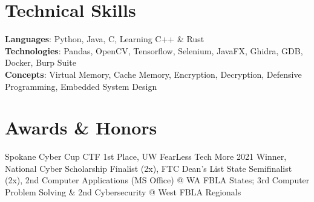 \section{Technical Skills}
    \begin{itemize}[leftmargin=0.15in, label={}]
	\small{\item{
		\textbf{Languages}{: Python, Java, C, Learning C++ \& Rust} \\
		\textbf{Technologies}{: Pandas, OpenCV, Tensorflow, Selenium, JavaFX, Ghidra, GDB, Docker, Burp Suite} \\
		\textbf{Concepts}{: Virtual Memory, Cache Memory, Encryption, Decryption, Defensive Programming, Embedded System Design}
	}}
    \end{itemize}

\section{Awards \& Honors}
\small{Spokane Cyber Cup CTF 1st Place, UW FearLess Tech More 2021 Winner, National Cyber Scholarship Finalist (2x), FTC Dean’s List State Semifinalist (2x), 2nd Computer Applications (MS Office) @ WA FBLA States; 3rd Computer Problem Solving \& 2nd Cybersecurity @ West FBLA Regionals
}
